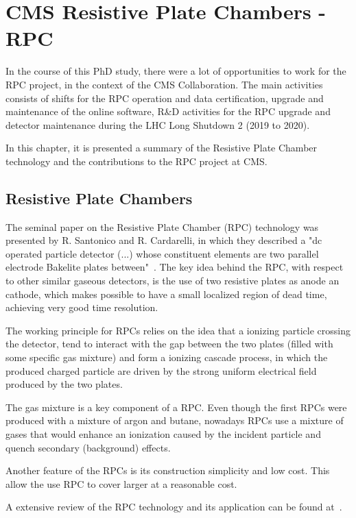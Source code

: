 \chapter{CMS Resistive Plate Chambers - RPC}
\label{chapter_rpc}

In the course of this PhD study, there were a lot of opportunities to work for the RPC project, in the context of the CMS Collaboration. The main activities consists of shifts for the RPC operation and data certification, upgrade and maintenance of the online software, R\&D activities for the RPC upgrade and detector maintenance during the LHC Long Shutdown 2 (2019 to 2020).

In this chapter, it is presented a summary of the Resistive Plate Chamber technology and the contributions to the RPC project at CMS.

\section{Resistive Plate Chambers}

The seminal paper on the Resistive Plate Chamber (RPC) technology was presented by R. Santonico and R. Cardarelli, in which they described a "dc operated particle detector (...) whose constituent elements are two parallel electrode Bakelite plates between"~\cite{rpc_seminal}. The key idea behind the RPC, with respect to other similar gaseous detectors, is the use of two resistive plates as anode an cathode, which makes possible to have a small localized region of dead time, achieving very good time resolution. 

The working principle for RPCs relies on the idea that a ionizing particle crossing the detector, tend to interact with the gap between the two plates (filled with some specific gas mixture) and form a ionizing cascade process, in which the produced charged particle are driven by the strong uniform electrical field produced by the two plates.

The gas mixture is a key component of a RPC. Even though the first RPCs were produced with a mixture of argon and butane, nowadays RPCs use a mixture of gases that would enhance an ionization caused by the incident particle and quench secondary (background) effects.

Another feature of the RPCs is its construction simplicity and low cost. This allow the use RPC to cover larger at a reasonable cost. 

A extensive review of the RPC technology and its application can be found at~\cite{livro_rpc}.

